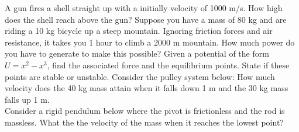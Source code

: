 \documentclass[12pt]{article}
\begin{document}
\noindent A gun fires a shell straight up with a initially velocity of 1000 m/s.  How high does the shell reach above the gun?
\newpage
\noindent Suppose you have a mass of 80 kg and are riding a 10 kg bicycle up a steep mountain.  Ignoring friction forces and air resistance, it takes 
you 1 hour to climb a 2000 m mountain.  How much power do you have to generate to make this possible?
\newpage
\noindent Given a potential of the form $U = x^2 - x^3$, find the associated force and the equilibrium points.  State if these points are stable or unstable.
\newpage
\noindent Consider the pulley system below:  How much velocity does the 40 kg mass attain when it falls down 1 m and the 30 kg mass falls up 1 m.\\
\resizebox{!}{6cm}{}
\newpage
\noindent Consider a rigid pendulum below where the pivot is frictionless and the rod is massless.  What the the velocity of the mass when it reaches the lowest point?\\
\resizebox{12cm}{!}{}
\end{document}
